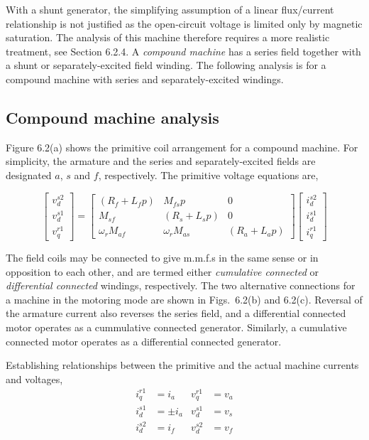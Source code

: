 \documentclass[a4paper,numbers=noenddot,12pt]{scrbook}
\begin{document}
With a shunt generator, the simplifying assumption of a linear flux/current relationship is not justified as the open-circuit voltage is limited only by magnetic saturation. The analysis of this machine therefore requires a more realistic treatment, see Section 6.2.4.
A \textit{compound machine} has a series field together with a shunt or separately-excited field winding. The following analysis is for a compound machine with series and separately-excited windings.
\subsection{Compound machine analysis} Figure 6.2(a) shows the primitive coil arrangement for a compound machine. For simplicity, the armature and the series and separately-excited fields are designated $a$, $s$ and $f$, respectively. The primitive voltage equations are,

\begin{equation}
    \begin{bmatrix}
        v_d^{s2}\\[2ex] v_d^{s1}\\[2ex] v_q^{r1}
    \end{bmatrix} =
    \begin{bmatrix}
        (R_f + L_f p) & M_{fs} p & 0 \\[2ex]
        M_{sf} & (R_s + L_s p) & 0 \\[2ex]
        \omega_r M_{af} & \omega_r M_{as} & (R_a + L_a p)
    \end{bmatrix}
    \begin{bmatrix}
        i_d^{s2} \\[2ex] i_d^{s1} \\[2ex] i_q^{r1}
    \end{bmatrix}
    \label{}
\end{equation}

The field coils may be connected to give m.m.f.s in the same sense or in opposition to each other, and are termed either \textit{cumulative connected} or \textit{differential connected} windings, respectively. The two alternative connections for a machine in the motoring mode are shown in Figs.\ 6.2(b) and 6.2(c).
Reversal of the armature current also reverses the series field, and a differential connected motor operates as a cummulative connected generator. Similarly, a cumulative connected motor operates as a differential connected generator.

Establishing relationships between the primitive and the actual machine currents and voltages,
\begin{align*}
    i_q^{r1} & = i_a & v_q^{r1} & = v_a \\[2ex]
    i_d^{s1} & = \pm i_a & v_d^{s1} & = v_s \\[2ex]
    i_d^{s2} & = i_f & v_d^{s2} & = v_f
\end{align*}
\end{document}
